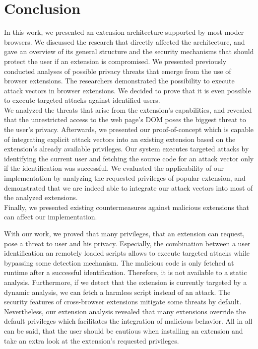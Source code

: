 
\chapter{Conclusion}
\label{chp:conclusion}

	In this work, we presented an extension architecture supported by most moder browsers. We discussed the research that directly affected the architecture, and gave an overview of its general structure and the security mechanisms that should protect the user if an extension is compromised. We presented previously conducted analyses of possible privacy threats that emerge from the use of browser extensions. The researchers demonstrated the possibility to execute attack vectors in browser extensions. We decided to prove that it is even possible to execute targeted attacks against identified users. \\
	We analyzed the threats that arise from the extension's capabilities, and revealed that the unrestricted access to the web page's DOM poses the biggest threat to the user's privacy. Afterwards, we presented our proof-of-concept which is capable of integrating explicit attack vectors into an existing extension based on the extension's already available privileges. Our system executes targeted attacks by identifying the current user and fetching the source code for an attack vector only if the identification was successful. We evaluated the applicability of our implementation by analyzing the requested privileges of popular extension, and demonstrated that we are indeed able to integrate our attack vectors into most of the analyzed extensions. \\
	Finally, we presented existing countermeasures against malicious extensions that can affect our implementation.
	
	With our work, we proved that many privileges, that an extension can request, pose a threat to user and his privacy. Especially, the combination between a user identification an remotely loaded scripts allows to execute targeted attacks while bypassing some detection mechanism. The malicious code is only fetched at runtime after a successful identification. Therefore, it is not available to a static analysis. Furthermore, if we detect that the extension is currently targeted by a dynamic analysis, we can fetch a harmless script instead of an attack. The security features of cross-browser extensions mitigate some threats by default. Nevertheless, our extension analysis revealed that many extensions override the default privileges which facilitates the integration of malicious behavior.	All in all can be said, that the user should be cautious when installing an extension and take an extra look at the extension's requested privileges.